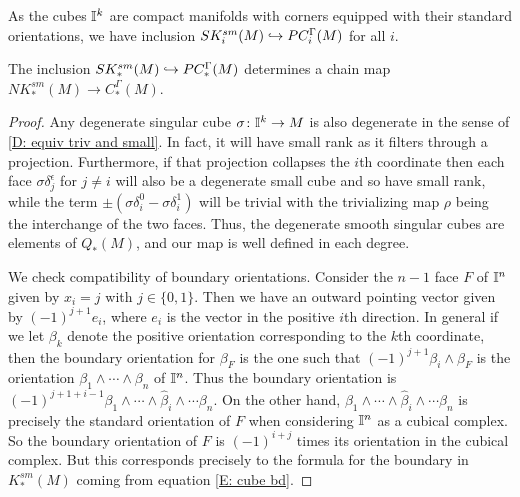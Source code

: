 As the cubes $\mathbb{I}^k$ are compact manifolds with corners equipped with their standard orientations,
we have inclusion $SK^{sm}_i(M) \hookrightarrow PC_i^\Gamma(M)$ for all $i$.

\begin{lemma}
	The inclusion $SK^{sm}_*(M) \hookrightarrow PC_*^\Gamma(M)$ determines a chain map $NK^{sm}_*(M) \to C_*^\Gamma(M)$.
\end{lemma}

\begin{proof}
	Any degenerate singular cube $\sigma \colon \mathbb{I}^k \to M$ is also degenerate in the sense of \cref{D: equiv triv and small}.
	In fact, it will have small rank as it filters through a projection.
	Furthermore, if that projection collapses the $i$th coordinate then each face $\sigma \delta_j^\epsilon$ for $j\neq i$ will also be a degenerate small cube and so have small rank, while the term $\pm (\sigma \delta_i^0-\sigma \delta_i^1)$ will be trivial with the trivializing map $\rho$ being the interchange of the two faces.
	Thus, the degenerate smooth singular cubes are elements of $Q_*(M)$, and our map is well defined in each degree.

	We check compatibility of boundary orientations.
	Consider the $n-1$ face $F$ of $\mathbb{I}^n$ given by $x_i = j$ with $j\in\{0,1\}$.
	Then we have an outward pointing vector given by $(-1)^{j+1}e_i$, where $e_i$ is the vector in the positive $i$th direction.
	In general if we let $\beta_k$ denote the positive orientation corresponding to the $k$th coordinate, then the boundary orientation for $\beta_F$ is the one such that
	$(-1)^{j+1}\beta_i \wedge \beta_F$ is the orientation $\beta_1 \wedge\cdots\wedge \beta_n$ of $\mathbb{I}^n$.
	Thus the boundary orientation is $(-1)^{j+1+i-1}\beta_1 \wedge \cdots \wedge \hat{\beta}_i \wedge \cdots\beta_n$.
	On the other hand, $\beta_1 \wedge \cdots \wedge \hat{\beta}_i \wedge \cdots\beta_n$ is precisely the standard orientation of $F$ when considering $\mathbb{I}^n$ as a cubical complex.
	So the boundary orientation of $F$ is $(-1)^{i+j}$ times its orientation in the cubical complex.
	But this corresponds precisely to the formula for the boundary in $K^{sm}_*(M)$ coming from equation \eqref{E: cube bd}.
\end{proof}

